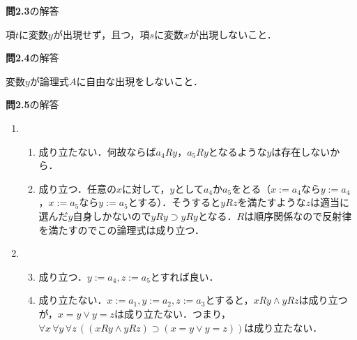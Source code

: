 \documentclass[11pt,dvipdfmx]{jreport}
\begin{document}
\par
\vspace{5mm}

\noindent \textbf{問2.3}の解答
\par
項$t$に変数$y$が出現せず，且つ，項$s$に変数$x$が出現しないこと．%

\par
\vspace{7mm}

\noindent \textbf{問2.4}の解答 
\par
変数$y$が論理式$A$に自由な出現をしないこと．

\par
\vspace{7mm}

\noindent \textbf{問2.5}の解答 
\renewcommand{\labelenumi}{(\arabic{enumi}) }
\renewcommand{\labelenumii}{\arabic{enumii}) }
\begin{enumerate}
 \item 
  \begin{enumerate}
   \item 成り立たない．何故ならば$a_{4}Ry$，$a_{5}Ry$となるような$y$は存在しないから．
   \item 成り立つ．任意の$x$に対して，$y$として$a_{4}$か$a_{5}$をとる（$x := a_{4}$なら$y := a_{4}$，$x := a_{5}$なら$y := a_{5}$とする）．そうすると$yRz$を満たすような$z$は適当に選んだ$y$自身しかないので$yRy \supset yRy$となる．$R$は順序関係なので反射律を満たすのでこの論理式は成り立つ．
  \end{enumerate}
 \item 
　\begin{enumerate}
   \setcounter{enumii}{2}
   \item 成り立つ．$y := a_{4}, z := a_{5}$とすれば良い．
   \item 成り立たない．$x := a_{1}, y := a_{2}, z := a_{3}$とすると，$xRy \land yRz$は成り立つが，$x = y \lor y = z$は成り立たない．つまり，$\forall x \, \forall y \, \forall z \, ((xRy \land yRz) \supset (x=y \lor y = z))$は成り立たない．
 \end{enumerate}
\end{enumerate}

\par
\vspace{5mm}
\end{document}
